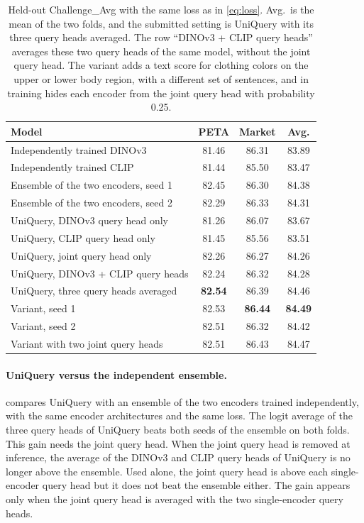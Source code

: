 \documentclass[10pt,twocolumn,letterpaper]{article}
\begin{document}
\begin{table}[t]
\centering
\small
\setlength{\tabcolsep}{3pt}
\begin{tabular}{@{}lccc@{}}
\toprule
Model & PETA & Market & Avg. \\
\midrule
Independently trained DINOv3 & 81.46 & 86.31 & 83.89 \\
Independently trained CLIP & 81.44 & 85.50 & 83.47 \\
Ensemble of the two encoders, seed 1 & 82.45 & 86.30 & 84.38 \\
Ensemble of the two encoders, seed 2 & 82.29 & 86.33 & 84.31 \\
\midrule
UniQuery, DINOv3 query head only & 81.26 & 86.07 & 83.67 \\
UniQuery, CLIP query head only & 81.45 & 85.56 & 83.51 \\
UniQuery, joint query head only & 82.26 & 86.27 & 84.26 \\
UniQuery, DINOv3 + CLIP query heads & 82.24 & 86.32 & 84.28 \\
UniQuery, three query heads averaged & \textbf{82.54} & 86.39 & 84.46 \\
\midrule
Variant, seed 1 & 82.53 & \textbf{86.44} & \textbf{84.49} \\
Variant, seed 2 & 82.51 & 86.32 & 84.42 \\
Variant with two joint query heads & 82.51 & 86.43 & 84.47 \\
\bottomrule
\end{tabular}
\caption{Held-out Challenge\_Avg with the same loss as in \cref{eq:loss}. Avg.\ is the mean of the two folds, and the submitted setting is UniQuery with its three query heads averaged. The row ``DINOv3 + CLIP query heads'' averages these two query heads of the same model, without the joint query head. The variant adds a text score for clothing colors on the upper or lower body region, with a different set of sentences, and in training hides each encoder from the joint query head with probability 0.25.}
\label{tab:main}
\end{table}

\paragraph{UniQuery versus the independent ensemble.}  compares UniQuery with an ensemble of the two encoders trained independently, with the same encoder architectures and the same loss. The logit average of the three query heads of UniQuery beats both seeds of the ensemble on both folds. This gain needs the joint query head. When the joint query head is removed at inference, the average of the DINOv3 and CLIP query heads of UniQuery is no longer above the ensemble. Used alone, the joint query head is above each single-encoder query head but it does not beat the ensemble either. The gain appears only when the joint query head is averaged with the two single-encoder query heads.
\end{document}
